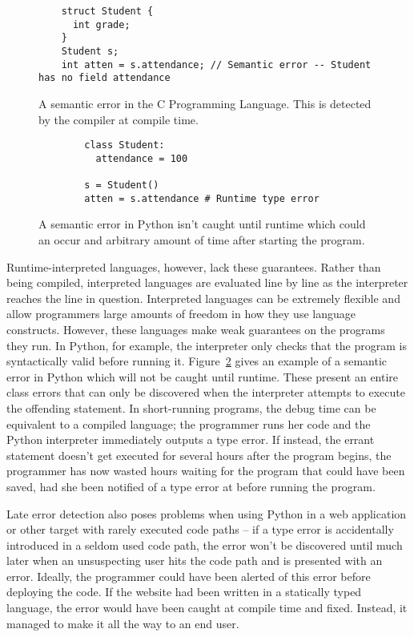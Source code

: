 \documentclass{article}[12pt]
\begin{document}
\begin{figure} \begin{verbatim} 
    struct Student { 
      int grade; 
    } 
    Student s; 
    int atten = s.attendance; // Semantic error -- Student has no field attendance 
  \end{verbatim} 
  \caption{A semantic error in the C Programming Language. This is
    detected by the compiler at compile time.} 
  \label{fig:csemanticerror}
\end{figure}

\begin{figure}
    \begin{verbatim}
        class Student:
          attendance = 100

        s = Student()
        atten = s.attendance # Runtime type error
    \end{verbatim}
    \caption{A semantic error in Python isn't caught until runtime which could an occur and
    arbitrary amount of time after starting the program.}
    \label{fig:pythonsemanticerror}
\end{figure}

Runtime-interpreted languages, however, lack these guarantees. Rather than being compiled,
interpreted languages are evaluated line by line as the interpreter reaches the line in question.
Interpreted languages can be extremely flexible and allow programmers large amounts of freedom in
how they use language constructs. However, these languages make weak guarantees on the programs they
run. In Python, for example, the interpreter only checks that the program is syntactically valid
before running it. Figure~\ref{fig:pythonsemanticerror} gives an example of a semantic error in
Python which will not be caught until runtime. These present an entire class errors that can only be
discovered when the interpreter attempts to execute the offending statement. In short-running
programs, the debug time can be equivalent to a compiled language; the programmer runs her code and
the Python interpreter immediately outputs a type error. If instead, the errant statement doesn't
get executed for several hours after the program begins, the programmer has now wasted hours waiting
for the program that could have been saved, had she been notified of a type error at
before running the program. 

Late error detection also poses problems when using Python in a web application or other target with rarely executed
code paths -- if a type error is accidentally introduced in a seldom used code path, the error won't be discovered until
much later when an unsuspecting user hits the code path and is presented with an error. Ideally, the programmer could have been
alerted of this error before deploying the code. If the website had been written in a statically typed language, the
error would have been caught at compile time and fixed. Instead, it managed to make it all the way to an end user.
\end{document}
